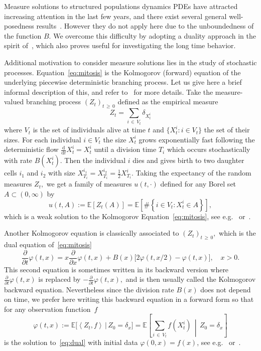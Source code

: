 \documentclass[AHL,Unicode,longabstracts,published]{cedram}
\newcommand{\p}{\partial}
\renewcommand{\geq}{\geqslant}
\newcommand{\ddt}{\frac{\p}{\p t}}
\newcommand{\ddx}{\frac{\p}{\p x}}
\newcommand{\E}{\mathbb{E}}
\newcommand{\1}{\mathds{1}}
\renewcommand{\d}{\mathrm{d}}
\begin{document}
Measure solutions to structured populations dynamics PDEs have attracted increasing attention in the last few years, and there exist several general well-posedness results~\cite{Carrillo2012,CanizoCarrilloCuadrado,EversHilleMuntean15,EversHilleMuntean16,Gwiazda2010}. However they do not apply here due to the unboundedness of the function $B$. We overcome this difficulty by adopting a duality approach in the spirit of~\cite{Bansaye2019,Bansaye2017,Dumont2017,Gabriel2018}, which also proves useful for investigating the long time behavior.



Additional motivation to consider measure solutions lies in the study of stochastic processes. Equation~\eqref{eq:mitosis} is the Kolmogorov (forward) equation of the underlying piecewise deterministic branching process. Let us give here a brief informal description of this, and refer to~\cite{Campillo,Cloez,DerfelVanBruntWake,DHKR,Marguet1} for more details. Take the measure-valued branching process $(Z_t)_{t\,\geq\,0}$ defined as the empirical measure
\[
Z_t=\sum_{i\,\in\,V_t}\delta_{X^i_t}
\]
where $V_t$ is the set of individuals alive at time $t$ and $\{X^i_t : i\in V_t\}$ the set of their sizes. For each individual $i\in V_t$ the size $X^i_t$ grows exponentially fast following the deterministic flow $\tfrac{\d}{\d t}X^i_t=X^i_t$ until a division time $T_i$ which occurs stochastically with rate $B(X^i_t).$ Then the individual $i$ dies and gives birth to two daughter cells $i_1$ and $i_2$ with size $X^{i_1}_{T_i}=X^{i_2}_{T_i}=\tfrac12 X^i_{T_i}.$ Taking the expectancy of the random measures $Z_t,$ we get a family of measures $u(t,\cdot)$ defined for any Borel set $A\subset(0,\infty)$ by
\[
u(t,A):=\E\left[Z_t(A)\right]=\E\left[\#\left\{i\in V_t:X^i_t\in A\right\}\right],
\]
which is a weak solution to the Kolmogorov Equation~\eqref{eq:mitosis}, see e.g.~\cite[Theorem~1]{DHKR} or~\cite[Corollary~5.1]{Marguet1}.

Another Kolmogorov equation is classically associated to $(Z_t)_{t\,\geq\,0},$ which is the dual equation of~\eqref{eq:mitosis}
\begin{equation}\label{eq:dual}
\ddt \varphi(t,x) = x \ddx \varphi(t,x) + B(x)\big[2\varphi(t,x/2)-\varphi(t,x)\big],\quad x>0.
\end{equation}
This second equation is sometimes written in its backward version where $\ddt \varphi(t,x)$ is replaced by $-\ddt \varphi(t,x),$ and is then usually called the Kolmogorov backward equation. Nevertheless since the division rate $B(x)$ does not depend on time, we prefer here writing this backward equation in a forward form so that for any observation function~$f$
\[
\varphi(t,x):=\E\big[\left\langle Z_t,f\right\rangle\,\big|\,Z_0=\delta_x\big]=\E\left[\sum_{i\,\in\,V_t}f\left(X^i_t\right)\,\middle|\,Z_0=\delta_x\right]
\]
is the solution to~\eqref{eq:dual} with initial data $\varphi(0,x)=f(x)$, see e.g.~\cite[Proposition~4]{Campillo} or~\cite[Corollary~2.4]{Cloez}.
\end{document}
